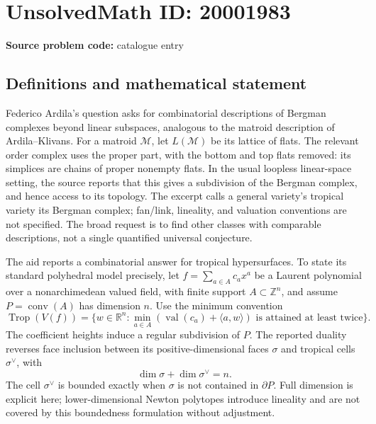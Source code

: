 \documentclass[11pt]{article}
\newcommand{\Z}{\mathbb{Z}}
\newcommand{\R}{\mathbb{R}}
\begin{document}
\section*{UnsolvedMath ID: 20001983}
\textbf{Source problem code:} catalogue entry
\subsection{Definitions and mathematical statement}
Federico Ardila's question asks for combinatorial descriptions of Bergman complexes beyond linear subspaces, analogous to the matroid description of Ardila--Klivans. For a matroid \(\mathcal M\), let \(L(\mathcal M)\) be its lattice of flats. The relevant order complex uses the proper part, with the bottom and top flats removed: its simplices are chains of proper nonempty flats. In the usual loopless linear-space setting, the source reports that this gives a subdivision of the Bergman complex, and hence access to its topology. The excerpt calls a general variety's tropical variety its Bergman complex; fan/link, lineality, and valuation conventions are not specified. The broad request is to find other classes with comparable descriptions, not a single quantified universal conjecture.

The aid reports a combinatorial answer for tropical hypersurfaces. To state its standard polyhedral model precisely, let \(f=\sum_{a\in A}c_ax^a\) be a Laurent polynomial over a nonarchimedean valued field, with finite support \(A\subset\Z^n\), and assume \(P=\operatorname{conv}(A)\) has dimension \(n\). Use the minimum convention
\[
 \operatorname{Trop}(V(f))=\{w\in\R^n:
 \min_{a\in A}(\operatorname{val}(c_a)+\langle a,w\rangle)
 \text{ is attained at least twice}\}.
\]
The coefficient heights induce a regular subdivision of \(P\). The reported duality reverses face inclusion between its positive-dimensional faces \(\sigma\) and tropical cells \(\sigma^\vee\), with
\[
 \dim\sigma+\dim\sigma^\vee=n.
\]
The cell \(\sigma^\vee\) is bounded exactly when \(\sigma\) is not contained in \(\partial P\). Full dimension is explicit here; lower-dimensional Newton polytopes introduce lineality and are not covered by this boundedness formulation without adjustment.
\end{document}
